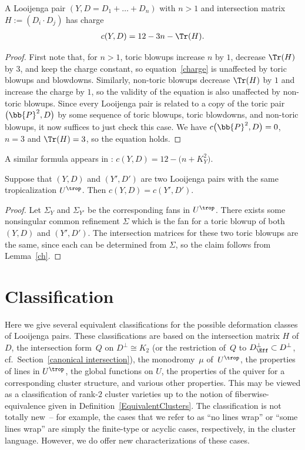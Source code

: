 \begin{lem} \label{ch}A Looijenga pair $(Y,D=D_1+\dots+D_n)$ with $n>1$ and intersection matrix $H:= (D_i\cdot D_j )$ has charge
\begin{gather}\label{charge}
	c(Y,D)=12-3n-\Tr(H).
\end{gather}
\end{lem}

\begin{proof}First note that, for $n>1$, toric blowups increase $n$ by $1$, decrease $\Tr(H)$ by $3$, and keep the charge constant, so equation~\eqref{charge} is unaffected by toric blowups and blowdowns. Similarly, non-toric blowups decrease $\Tr(H)$ by $1$ and increase the charge by $1$, so the validity of the equation is also unaffected by non-toric blowups. Since every Looijenga pair is related to a copy of the toric pair $\big(\bb{P}^2,D\big)$ by some sequence of toric blowups, toric blowdowns, and non-toric blowups, it now suffices to just check this case. We have $c\big(\bb{P}^2,D\big)=0$, $n=3$ and $\Tr(H)=3$, so the equation holds.
\end{proof}

A similar formula appears in \cite{GHK2}: $c(Y,D)=12-\big(n+K_Y^2\big)$.

\begin{prop}\label{TropCharge}Suppose that $(Y,D)$ and $(Y',D')$ are two Looijenga pairs with the same tropicalization $U^{\trop}$. Then $c(Y,D)=c(Y',D')$.
\end{prop}

\begin{proof}Let $\Sigma_Y$ and $\Sigma_{Y'}$ be the corresponding fans in $U^{\trop}$. There exists some nonsingular common refinement $\Sigma$ which is the fan for a toric blowup of both $(Y,D)$ and $(Y',D')$. The intersection matrices for these two toric blowups are the same, since each can be determined from $\Sigma$, so the claim follows from Lemma~\ref{ch}.
\end{proof}

\section{Classification}\label{classification}

Here we give several equivalent classifications for the possible deformation classes of Looijenga pairs. These classifications are based on the intersection matrix $H$ of $D$, the intersection form~$Q$ on $D^{\perp}\cong K_2$ (or the restriction of~$Q$ to $D^{\perp}_{\Eff} \subset D^{\perp}$, cf.\ Section~\ref{canonical intersection}), the monodromy~$\mu$ of~$U^{\trop}$, the properties of lines in $U^{\trop}$, the global functions on $U$, the properties of the quiver for a corresponding cluster structure, and various other properties. This may be viewed as a classification of rank-$2$ cluster varieties up to the notion of fiberwise-equivalence given in Definition~\ref{EquivalentClusters}. The classification is not totally new~-- for example, the cases that we refer to as ``no lines wrap'' or ``some lines wrap'' are simply the finite-type or acyclic cases, respectively, in the cluster language. However, we do offer new characterizations of these cases.

